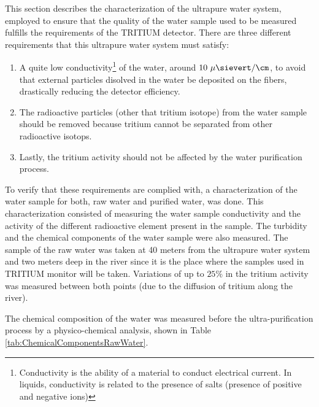 This section describes the characterization of the ultrapure water system, employed to ensure that the quality of the water sample used to be measured fulfills the requirements of the TRITIUM detector. There are three different requirements that this ultrapure water system must satisfy:

\begin{enumerate}
\item{} A quite low conductivity\footnote{Conductivity is the ability of a material to conduct electrical current. In liquids, conductivity is related to the presence of salts (presence of positive and negative ions)} of the water, around $10~\mu\sievert/\cm$, to avoid that external particles disolved in the water be deposited on the fibers, drastically reducing the detector efficiency.

\item{} The radioactive particles (other that tritium isotope) from the water sample should be removed because tritium cannot be separated from other radioactive isotops.

\item{} Lastly, the tritium activity should not be affected by the water purification process. 

\end{enumerate}

To verify that these requirements are complied with, a characterization of the water sample for both, raw water and purified water, was done. This characterization consisted of measuring the water sample conductivity and the activity of the different radioactive element present in the sample. The turbidity and the chemical components of the water sample were also measured. The sample of the raw water was taken at 40 meters from the ultrapure water system and two meters deep in the river since it is the place where the samples used in TRITIUM monitor will be taken. Variations of up to $25\%$ in the tritium activity was measured between both points (due to the diffusion of tritium along the river).

The chemical composition of the water was measured before the ultra-purification process by a physico-chemical analysis, shown in Table \ref{tab:ChemicalComponentsRawWater}.

